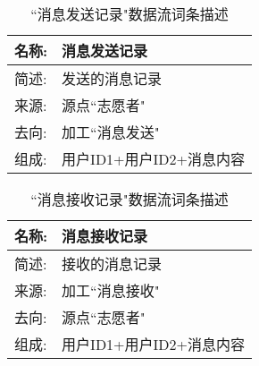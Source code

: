 \begin{table}[H]  
\caption{``消息发送记录"数据流词条描述}  
\begin{center}  
    \begin{tabular}{l p{11cm}} 
        \hline
        \quad 名称:  &   消息发送记录 \\
        \hline
        \quad 简述:  & 发送的消息记录 \\
        \hline
        \quad 来源:  & 源点``志愿者" \\
        \hline
        \quad 去向:  & 加工``消息发送" \\
        \hline
        \quad 组成:  & 用户ID1+用户ID2+消息内容 \\
        \hline
    \end{tabular}
    \label{tab1}
\end{center}
\end{table}


\begin{table}[H]  
\caption{``消息接收记录"数据流词条描述}  
\begin{center}  
    \begin{tabular}{l p{11cm}} 
        \hline
        \quad 名称:  &   消息接收记录 \\
        \hline
        \quad 简述:  & 接收的消息记录 \\
        \hline
        \quad 来源:  & 加工``消息接收" \\
        \hline
        \quad 去向:  & 源点``志愿者" \\
        \hline
        \quad 组成:  & 用户ID1+用户ID2+消息内容 \\
        \hline
    \end{tabular}
    \label{tab1}
\end{center}
\end{table}
